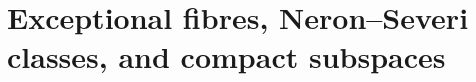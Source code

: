 \section{Exceptional fibres, Neron--Severi classes, and compact subspaces}\hypertarget{tag-01PP}{}\label{fam:section:D}